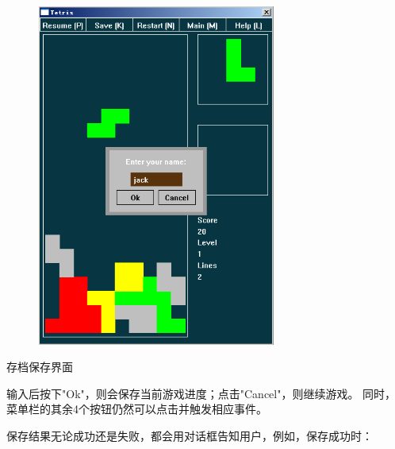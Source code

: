 \documentclass{style/ucasproposal}
\begin{document}
\begin{center}
\begin{figure}[H]
\center
    \includegraphics[width=0.7\textwidth]{./img/manual/4-save.png}
\end{figure}
存档保存界面
\end{center}

输入后按下"Ok"，则会保存当前游戏进度；点击"Cancel"，则继续游戏。
同时，菜单栏的其余4个按钮仍然可以点击并触发相应事件。

保存结果无论成功还是失败，都会用对话框告知用户，例如，保存成功时：
\end{document}
